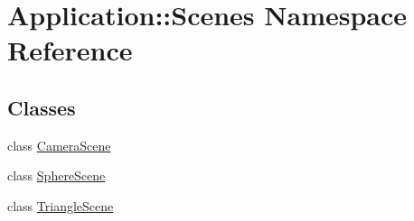\hypertarget{namespaceApplication_1_1Scenes}{}\section{Application\+:\+:Scenes Namespace Reference}
\label{namespaceApplication_1_1Scenes}
\subsection*{Classes}
\begin{DoxyCompactItemize}
\item 
class \mbox{\hyperlink{classApplication_1_1Scenes_1_1CameraScene}{Camera\+Scene}}
\item 
class \mbox{\hyperlink{classApplication_1_1Scenes_1_1SphereScene}{Sphere\+Scene}}
\item 
class \mbox{\hyperlink{classApplication_1_1Scenes_1_1TriangleScene}{Triangle\+Scene}}
\end{DoxyCompactItemize}
